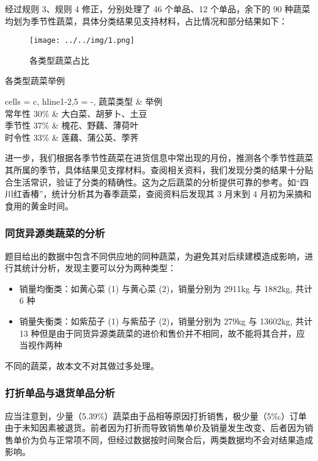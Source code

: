 \documentclass[withoutpreface,bwprint]{cumcmthesis} %
\begin{document}
经过规则 3、规则 4 修正，分别处理了 46 个单品、12 个单品，余下的 90 种蔬菜均划为季节性蔬菜，具体分类结果见支持材料，占比情况和部分结果如下：

\begin{figure}[H]
    \small
    \centering
    \texttt{[image: ../../img/1.png]}
    \caption{各类型蔬菜占比}
	\label{fig1}
\end{figure}

\begin{table}[H]
	\centering
	\caption{各类型蔬菜举例}
	\begin{tblr}{
	  cells = {c},
	  hline{1-2,5} = {-}{},
	}
	蔬菜类型     & 举例         \\
	常年性 30\% & 大白菜、胡萝卜、土豆 \\
	季节性 37\% & 槐花、野藕、薄荷叶  \\
	时令性 33\% & 莲藕、蒲公英、荸荠  
	\end{tblr}
	\end{table}

	进一步，我们根据各季节性蔬菜在进货信息中常出现的月份，推测各个季节性蔬菜其所属的季节，具体结果见支撑材料。查阅相关资料，我们发现分类的结果十分贴合生活常识，验证了分类的精确性。这为之后蔬菜的分析提供可靠的参考。如“四川红香椿”，统计分析其为春季蔬菜，查阅资料后发现其 3 月末到 4 月初为采摘和食用的黄金时间。

\subsubsection{同货异源类蔬菜的分析}

题目给出的数据中包含不同供应地的同种蔬菜，为避免其对后续建模造成影响，进行其统计分析，发现主要可以分为两种类型：

\begin{itemize}
    \item 销量均衡类：如黄心菜 (1) 与黄心菜 (2)，销量分别为 2911kg 与 1882kg, 共计 6 种
    \item 销量失衡类：如紫茄子 (1) 与紫茄子 (2)，销量分别为 279kg 与 13602kg, 共计 13 种但是由于同货异源类蔬菜的进价和售价并不相同，故不能将其合并，应当视作两种
\end{itemize}

不同的蔬菜，故本文不对其做过多处理。

\subsubsection{打折单品与退货单品分析}

应当注意到，少量（5.39\%）蔬菜由于品相等原因打折销售，极少量（5‰）订单由于未知因素被退货。前者因为打折而导致销售单价及销量发生改变、后者因为销售单价为负与正常项不同，但经过数据按时间聚合后，两类数据均不会对结果造成影响。
\end{document}
